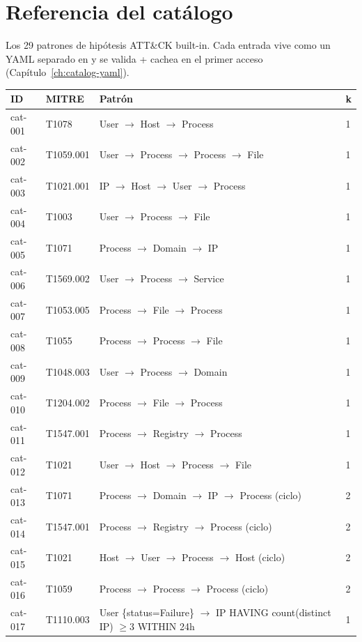 \chapter{Referencia del catálogo}
\label{app:catalog}

Los 29 patrones de hipótesis ATT\&CK built-in. Cada entrada vive
como un YAML separado en
 y
se valida + cachea en el primer acceso
(Capítulo~\ref{ch:catalog-yaml}).

\begin{table}[h]
\centering
\scriptsize
\begin{tabular}{@{}llll@{}}
\toprule
\textbf{ID} & \textbf{MITRE} & \textbf{Patrón} & \textbf{k} \\
\midrule
cat-001 & T1078     & User $\to$ Host $\to$ Process & 1 \\
cat-002 & T1059.001 & User $\to$ Process $\to$ Process $\to$ File & 1 \\
cat-003 & T1021.001 & IP $\to$ Host $\to$ User $\to$ Process & 1 \\
cat-004 & T1003     & User $\to$ Process $\to$ File & 1 \\
cat-005 & T1071     & Process $\to$ Domain $\to$ IP & 1 \\
cat-006 & T1569.002 & User $\to$ Process $\to$ Service & 1 \\
cat-007 & T1053.005 & Process $\to$ File $\to$ Process & 1 \\
cat-008 & T1055     & Process $\to$ Process $\to$ File & 1 \\
cat-009 & T1048.003 & User $\to$ Process $\to$ Domain & 1 \\
cat-010 & T1204.002 & Process $\to$ File $\to$ Process & 1 \\
cat-011 & T1547.001 & Process $\to$ Registry $\to$ Process & 1 \\
cat-012 & T1021     & User $\to$ Host $\to$ Process $\to$ File & 1 \\
cat-013 & T1071     & Process $\to$ Domain $\to$ IP $\to$ Process (ciclo) & 2 \\
cat-014 & T1547.001 & Process $\to$ Registry $\to$ Process (ciclo) & 2 \\
cat-015 & T1021     & Host $\to$ User $\to$ Process $\to$ Host (ciclo) & 2 \\
cat-016 & T1059     & Process $\to$ Process $\to$ Process (ciclo) & 2 \\
cat-017 & T1110.003 & User \{status=Failure\} $\to$ IP HAVING count(distinct IP) $\geq 3$ WITHIN 24h & 1 \\

\end{tabular}
\end{table}
